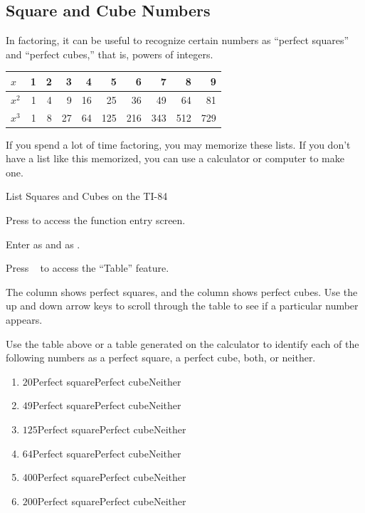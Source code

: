 \subsection{Square and Cube Numbers} 
In factoring, it can be useful to recognize certain numbers as ``perfect squares'' and ``perfect cubes,'' that is, powers of integers.
\begin{center}
\begin{tabularx}{0.9\textwidth}{|l|RRRRRRRRR|}
\hline
$x$&1&2&3&4&5&6&7&8&9\\\hline
$x^2$&1&4&9&16&25&36&49&64&81\\\hline
$x^3$&1&8&27&64&125&216&343&512&729\\\hline
\end{tabularx}
\end{center}
If you spend a lot of time factoring, you may memorize these lists. If you don't have a list like this memorized, you can use a calculator or computer to make one.
\begin{procedure}{List Squares and Cubes on the TI-84}
\begin{enumerate*}
\item Press  to access the function entry screen.
\item Enter  as  and  as .
\item Press \  to access the ``Table'' feature.
\item The  column shows perfect squares, and the  column shows perfect cubes. Use the up and down arrow keys to scroll through the table to see if a particular number appears.
\end{enumerate*}
\end{procedure}
\begin{Example}
Use the table above or a table generated on the calculator to identify each of the following numbers as a perfect square, a perfect cube, both, or neither.
\begin{enumerate}
\item $20$\hfill Perfect square\qquad Perfect cube\qquad Neither\makespace[1.75in]
\item $49$\hfill Perfect square\qquad Perfect cube\qquad Neither\makespace[1.75in]
\item $125$\hfill Perfect square\qquad Perfect cube\qquad Neither\makespace[1.75in]
\item $64$\hfill Perfect square\qquad Perfect cube\qquad Neither\makespace[1.75in]
\item $400$\hfill Perfect square\qquad Perfect cube\qquad Neither\makespace[1.75in]
\item $200$\hfill Perfect square\qquad Perfect cube\qquad Neither\makespace[1.75in]
\end{enumerate}
\end{Example}